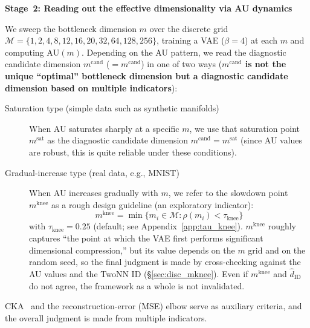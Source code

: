 \documentclass[make,article,submit,pdftex,moreauthors]{Definitions/mdpi}
\newcommand{\dzopt}{m^{\mathrm{cand}}}
\newcommand{\dzsat}{m^{\mathrm{sat}}}
\newcommand{\mknee}{m^{\mathrm{knee}}}
\begin{document}
\textbf{Stage~2: Reading out the effective dimensionality via AU dynamics}

We sweep the bottleneck dimension $m$ over the discrete grid
$\mathcal{M} = \{1, 2, 4, 8, 12,\allowbreak 16, 20, 32,\allowbreak 64, 128, 256\}$,
training a VAE ($\beta = 4$) at each $m$ and computing $\mathrm{AU}(m)$.
Depending on the AU pattern, we read the diagnostic candidate dimension
$\dzopt$ ($= m^{\mathrm{cand}}$) in one of two ways
(\textbf{$\dzopt$ is not the unique ``optimal'' bottleneck dimension but a
diagnostic candidate dimension based on multiple indicators}):

\begin{description}
  \item[Saturation type (simple data such as synthetic manifolds)]
        When AU saturates sharply at a specific $m$, we use that saturation point
        $\dzsat$ as the diagnostic candidate dimension $\dzopt = \dzsat$
        (since AU values are robust, this is quite reliable under these
        conditions).
  \item[Gradual-increase type (real data, e.g., MNIST)]
        When AU increases gradually with $m$, we refer to the slowdown point
        $\mknee$ as a rough design guideline (an exploratory indicator):
        \begin{equation}
          \mknee = \min\{m_i \in \mathcal{M} : \rho(m_i) < \tau_{\mathrm{knee}}\}
          \label{eq:mknee}
        \end{equation}
        with $\tau_{\mathrm{knee}} = 0.25$ (default; see Appendix~\ref{app:tau_knee}).
        $\mknee$ roughly captures ``the point at which the VAE first performs
        significant dimensional compression,'' but its value depends on the $m$
        grid and on the random seed, so the final judgment is made by
        cross-checking against the AU values and the TwoNN ID
        (§\ref{sec:disc_mknee}).
        Even if $\mknee$ and $\hat{d}_\mathrm{ID}$ do not agree, the framework as a
        whole is not invalidated.
\end{description}

CKA~\cite{kornblith2019cka} and the reconstruction-error (MSE) elbow serve as
auxiliary criteria, and the overall judgment is made from multiple indicators.
\end{document}
